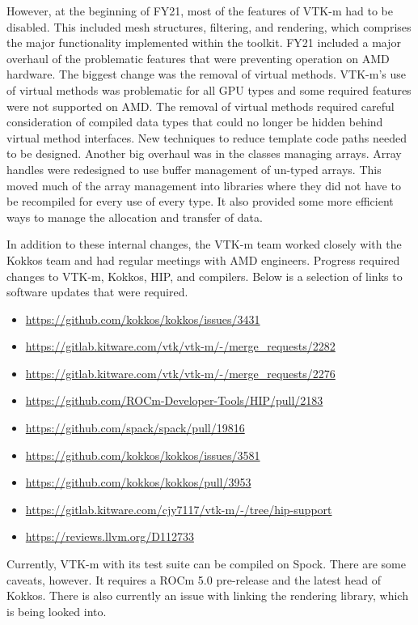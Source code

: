 However, at the beginning of FY21, most of the features of VTK-m had to be disabled.
This included mesh structures, filtering, and rendering, which comprises the major functionality implemented within the toolkit.
FY21 included a major overhaul of the problematic features that were preventing operation on AMD hardware.
The biggest change was the removal of virtual methods.
VTK-m's use of virtual methods was problematic for all GPU types and some required features were not supported on AMD.
The removal of virtual methods required careful consideration of compiled data types that could no longer be hidden behind virtual method interfaces.
New techniques to reduce template code paths needed to be designed.
Another big overhaul was in the classes managing arrays.
Array handles were redesigned to use buffer management of un-typed arrays.
This moved much of the array management into libraries where they did not have to be recompiled for every use of every type.
It also provided some more efficient ways to manage the allocation and transfer of data.

In addition to these internal changes, the VTK-m team worked closely with the Kokkos team and had regular meetings with AMD engineers.
Progress required changes to VTK-m, Kokkos, HIP, and compilers.
Below is a selection of links to software updates that were required.

\begin{itemize}
  \setlength{\itemsep}{0pt}
  \setlength{\parskip}{0pt}
  \setlength{\parsep}{0pt}
\item\url{https://github.com/kokkos/kokkos/issues/3431}
\item\url{https://gitlab.kitware.com/vtk/vtk-m/-/merge_requests/2282}
\item\url{https://gitlab.kitware.com/vtk/vtk-m/-/merge_requests/2276}
\item\url{https://github.com/ROCm-Developer-Tools/HIP/pull/2183}
\item\url{https://github.com/spack/spack/pull/19816}
\item\url{https://github.com/kokkos/kokkos/issues/3581}
\item\url{https://github.com/kokkos/kokkos/pull/3953}
\item\url{https://gitlab.kitware.com/cjy7117/vtk-m/-/tree/hip-support}
\item\url{https://reviews.llvm.org/D112733}
\end{itemize}

Currently, VTK-m with its test suite can be compiled on Spock.
There are some caveats, however.
It requires a ROCm 5.0 pre-release and the latest head of Kokkos.
There is also currently an issue with linking the rendering library, which is being looked into.

